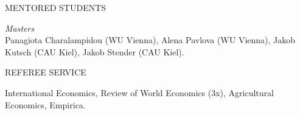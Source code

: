 \documentclass{article}
\begin{document}

\begin{minipage}[t]{0.12\textwidth}
    {\selectfont MENTORED STUDENTS} \\
\end{minipage}
\hspace{5mm}
\begin{minipage}[t]{0.8\textwidth}
    \textit{Masters} \\
    Panagiota Charalampidou (WU Vienna), Alena Pavlova (WU Vienna), Jakob Kutsch (CAU Kiel), Jakob Stender (CAU Kiel).
\end{minipage}
\medskip


\begin{minipage}[t]{0.12\textwidth}
    {\selectfont REFEREE SERVICE} \\
\end{minipage}
\hspace{5mm}
\begin{minipage}[t]{0.8\textwidth}
    International Economics, Review of World Economics (3x), Agricultural Economics, Empirica.
\end{minipage}
\medskip

\end{document}
